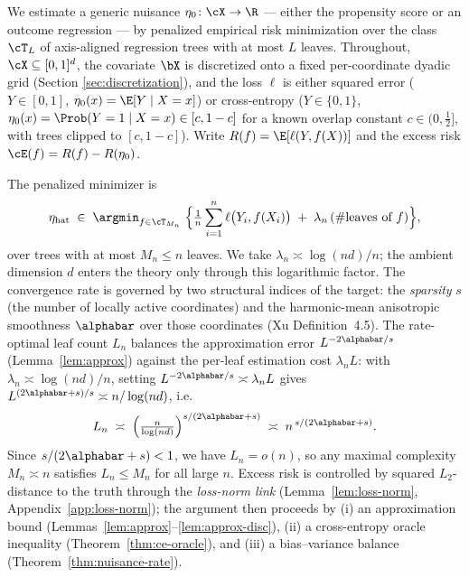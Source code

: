 
We estimate a generic nuisance $\eta_0 \colon \cX \to \R$ --- either the
propensity score or an outcome regression --- by penalized empirical risk
minimization over the class $\cT_L$ of axis-aligned regression trees with at
most $L$ leaves. Throughout, $\cX \subseteq [0,1]^d$, the covariate $\bX$ is
discretized onto a fixed per-coordinate dyadic grid (Section
\ref{sec:discretization}), and the loss $\ell$ is either squared error
($Y \in [0,1]$, $\eta_0(x) = \E[Y \mid X = x]$) or cross-entropy
($Y \in \{0,1\}$, $\eta_0(x) = \Prob(Y = 1 \mid X = x) \in [c, 1-c]$ for a
known overlap constant $c \in (0, \tfrac12]$, with trees clipped to
$[c,1-c]$). Write $R(f) = \E[\ell(Y, f(X))]$ and the excess risk
$\cE(f) = R(f) - R(\eta_0)$.

The penalized minimizer is
\begin{equation}\label{eq:perm}
  \eta_{\text{hat}} \;\in\;
  \argmin_{f \in \cT_{M_n}}\;
  \Bigl\{ \tfrac1n \sum_{i=1}^n \ell\bigl(Y_i, f(X_i)\bigr)
          \;+\; \lambda_n\, (\#\text{leaves of } f) \Bigr\},
\end{equation}
over trees with at most $M_n \le n$ leaves. We take
$\lambda_n \asymp \log(nd)/n$; the ambient dimension $d$ enters the theory only
through this logarithmic factor. The convergence rate is governed by two
structural indices of the target: the \emph{sparsity} $s$ (the number of
locally active coordinates) and the harmonic-mean anisotropic smoothness
$\alphabar$ over those coordinates (Xu Definition~4.5). The rate-optimal leaf
count $L_n$ balances the approximation error $L^{-2\alphabar/s}$
(Lemma~\ref{lem:approx}) against the per-leaf estimation cost $\lambda_n L$: with
$\lambda_n \asymp \log(nd)/n$, setting $L^{-2\alphabar/s} \asymp \lambda_n L$
gives $L^{(2\alphabar+s)/s} \asymp n/\log(nd)$, i.e.
\begin{equation}\label{eq:Ln}
  L_n \;\asymp\; \Bigl(\tfrac{n}{\log(nd)}\Bigr)^{s/(2\alphabar + s)}
  \;\asymp\; n^{\,s/(2\alphabar + s)}.
\end{equation}
Since $s/(2\alphabar+s) < 1$, we have $L_n = o(n)$, so any maximal complexity
$M_n \asymp n$ satisfies $L_n \le M_n$ for all large $n$. Excess risk is
controlled by squared $L_2$-distance to the truth through the
\emph{loss-norm link} (Lemma~\ref{lem:loss-norm}, Appendix~\ref{app:loss-norm});
the argument then proceeds by (i) an approximation bound
(Lemmas~\ref{lem:approx}--\ref{lem:approx-disc}), (ii) a cross-entropy oracle
inequality (Theorem~\ref{thm:ce-oracle}), and (iii) a bias--variance balance
(Theorem~\ref{thm:nuisance-rate}).

